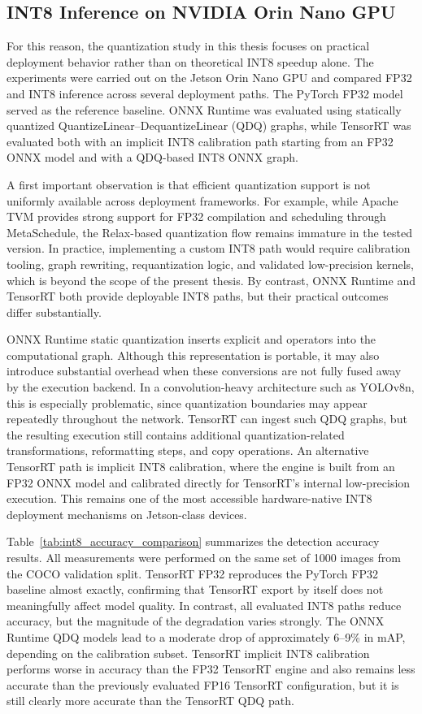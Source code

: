 \documentclass[12pt,a4paper]{report}
\begin{document}
\subsection{INT8 Inference on NVIDIA Orin Nano GPU}
\label{sec:orin_int8_results}

For this reason, the quantization study in this thesis focuses on practical deployment behavior rather than on
theoretical INT8 speedup alone. The experiments were carried out on the Jetson Orin Nano GPU and compared FP32 and
INT8 inference across several deployment paths. The PyTorch FP32 model served as the reference baseline. ONNX Runtime
was evaluated using statically quantized QuantizeLinear--DequantizeLinear (QDQ) graphs, while TensorRT was evaluated both with an implicit INT8
calibration path starting from an FP32 ONNX model and with a QDQ-based INT8 ONNX graph.

A first important observation is that efficient quantization support is not uniformly available across deployment
frameworks. For example, while Apache TVM provides strong support for FP32 compilation and scheduling through
MetaSchedule, the Relax-based quantization flow remains immature in the tested version. In practice, implementing a
custom INT8 path would require calibration tooling, graph rewriting, requantization logic, and validated low-precision
kernels, which is beyond the scope of the present thesis. By contrast, ONNX Runtime and TensorRT both provide
deployable INT8 paths, but their practical outcomes differ substantially.

ONNX Runtime static quantization inserts explicit  and  operators into
the computational graph. Although this representation is portable, it may also introduce substantial overhead when
these conversions are not fully fused away by the execution backend. In a convolution-heavy architecture such as
YOLOv8n, this is especially problematic, since quantization boundaries may appear repeatedly throughout the network.
TensorRT can ingest such QDQ graphs, but the resulting execution still contains additional quantization-related
transformations, reformatting steps, and copy operations. An alternative TensorRT path is implicit INT8 calibration,
where the engine is built from an FP32 ONNX model and calibrated directly for TensorRT's internal low-precision
execution. This remains one of the most accessible hardware-native INT8 deployment mechanisms on Jetson-class devices.

Table~\ref{tab:int8_accuracy_comparison} summarizes the detection accuracy results. All measurements were performed on
the same set of 1000 images from the COCO validation split. TensorRT FP32 reproduces the PyTorch FP32 baseline almost
exactly, confirming that TensorRT export by itself does not meaningfully affect model quality. In contrast, all
evaluated INT8 paths reduce accuracy, but the magnitude of the degradation varies strongly. The ONNX Runtime QDQ
models lead to a moderate drop of approximately 6--9\% in mAP, depending on the calibration subset. TensorRT implicit
INT8 calibration performs worse in accuracy than the FP32 TensorRT engine and also remains less accurate than the
previously evaluated FP16 TensorRT configuration, but it is still clearly more accurate than the TensorRT QDQ path.
\end{document}

